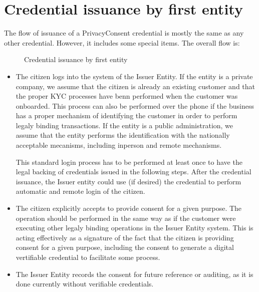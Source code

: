 \documentclass[a4paper,12pt,english,openany]{sphinxmanual}
\begin{document}
\section{Credential issuance by first entity}
\label{\detokenize{privacyconsent:credential-issuance-by-first-entity}}
\sphinxAtStartPar
The flow of issuance of a PrivacyConsent credential is mostly the same as any other credential. However, it includes some special items. The overall flow is:

\begin{figure}[htbp]
\centering
\capstart

\noindent{}
\caption{Credential issuance by first entity}\label{\detokenize{privacyconsent:id1}}\end{figure}
\begin{itemize}
\item {} 
\sphinxAtStartPar
The citizen logs into the system of the Issuer Entity. If the entity is a private company, we assume that the citizen is already an existing customer and that the proper KYC processes have benn performed when the customer was onboarded. This process can also be performed over the phone if the business has a proper mechanism of identifying the customer in order to perform legaly binding transactions. If the entity is a public administration, we assume that the entity performs the identification with the nationally acceptable mecanisms, including in\sphinxhyphen{}person and remote mechanisms.

\sphinxAtStartPar
This standard login process has to be performed at least once to have the legal backing of credentials issued in the following steps. After the credential issuance, the Issuer entity could use (if desired) the credential to perform automatic and remote login of the citizen.

\item {} 
\sphinxAtStartPar
The citizen explicitly accepts to provide consent for a given purpose. The operation should be performed in the same way as if the customer were executing other legaly binding operations in the Issuer Entity system. This is acting effectively as a signature of the fact that the citizen is providing consent for a given purpose, including the consent to generate a digital vertifiable credential to facilitate some process.

\item {} 
\sphinxAtStartPar
The Issuer Entity records the consent for future reference or auditing, as it is done currently without verifiable credentials.


\end{itemize}
\end{document}
